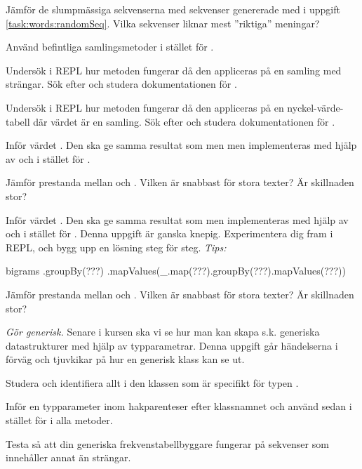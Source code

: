 \Subtask Jämför de slumpmässiga sekvenserna med sekvenser genererade med  i uppgift \ref{task:words:randomSeq}. Vilka sekvenser liknar mest ''riktiga'' meningar?


\Task Använd befintliga samlingsmetoder i stället för .

\Subtask Undersök i REPL hur metoden  fungerar då den appliceras på en samling med strängar. Sök efter och studera dokumentationen för .

\Subtask Undersök i REPL hur metoden  fungerar då den appliceras på en nyckel-värde-tabell där värdet är en samling. Sök efter och studera dokumentationen för .

\Subtask Inför värdet . Den ska ge samma resultat som  men men implementeras med hjälp av  och  i stället för .

\Subtask Jämför prestanda mellan  och . Vilken är snabbast för stora texter? Är skillnaden stor?

\Subtask Inför värdet . Den ska ge samma resultat som  men implementeras med hjälp av  och  i stället för .
Denna uppgift är ganska knepig. Experimentera dig fram i REPL, och bygg upp en lösning steg för steg. \emph{Tips:}
\begin{Code}
bigrams
  .groupBy(???)
  .mapValues(_.map(???).groupBy(???).mapValues(???))
\end{Code}

\Subtask Jämför prestanda mellan  och . Vilken är snabbast för stora texter? Är skillnaden stor?


\Task \emph{Gör  generisk.} Senare i kursen ska vi se hur man kan skapa s.k. generiska datastrukturer med hjälp av typparametrar. Denna uppgift går händelserna i förväg och tjuvkikar på hur en generisk klass kan se ut.

\Subtask Studera  och identifiera allt i den klassen som är specifikt för typen .

\Subtask Inför en typparameter  inom hakparenteser efter klassnamnet och använd sedan  i stället för  i alla metoder.

\Subtask Testa så att din generiska frekvenstabellbyggare fungerar på sekvenser som innehåller annat än strängar.

